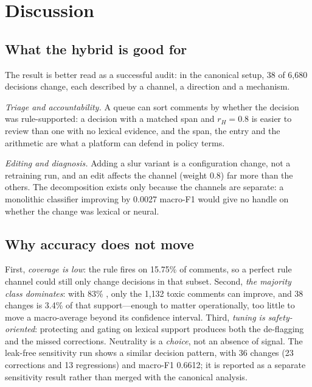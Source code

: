 \section{Discussion}

\label{sec:discussion}

\subsection{What the hybrid is good for}

The result is better read as a successful audit: in the canonical setup, 38 of
    6{,}680 decisions change, each described by a channel, a direction and a
mechanism.

\emph{Triage and accountability.} A queue can sort comments by whether the decision
was rule-supported: a \hate{} decision with a matched span and $r_H=0.8$ is easier
to review than one with no lexical evidence, and the span, the entry and the
arithmetic are what a platform can defend in policy terms.

\emph{Editing and diagnosis.} Adding a slur variant is a configuration change, not
a retraining run, and an edit affects the \hate{} channel (weight 0.8) far more than
the others. The decomposition exists only because the channels are separate: a
monolithic classifier improving by 0.0027 macro-F1 would give no handle on whether
the change was lexical or neural.

\subsection{Why accuracy does not move}

\label{sec:why-neutral}

First, \emph{coverage is low}: the rule fires on 15.75\% of comments, so a
perfect rule channel could still only change decisions in that subset. Second,
\emph{the majority class dominates}: with 83\% \clean{}, only the 1{,}132 toxic
comments can improve, and 38 changes is 3.4\% of that support---enough to
matter operationally, too little to move a macro-average beyond its confidence
interval. Third, \emph{tuning is safety-oriented}: protecting \clean{} and
gating \hate{} on lexical support produces both the de-flagging and the missed
corrections. Neutrality is a \emph{choice}, not an absence of signal. The
leak-free sensitivity run shows a similar decision pattern, with 36 changes (23
corrections and 13 regressions) and macro-F1 0.6612; it is reported as a
separate sensitivity result rather than merged with the canonical analysis.

